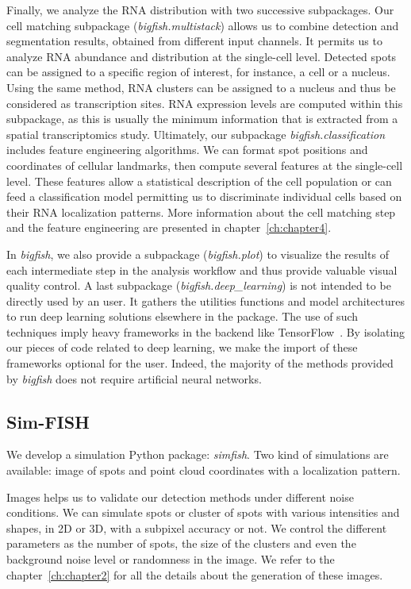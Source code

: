 Finally, we analyze the \ac{RNA} distribution with two successive subpackages.
Our cell matching subpackage (\emph{bigfish.multistack}) allows us to combine detection and segmentation results, obtained from different input channels.
It permits us to analyze \ac{RNA} abundance and distribution at the single-cell level.
Detected spots can be assigned to a specific region of interest, for instance, a cell or a nucleus.
Using the same method, \ac{RNA} clusters can be assigned to a nucleus and thus be considered as transcription sites.
\ac{RNA} expression levels are computed within this subpackage, as this is usually the minimum information that is extracted from a spatial transcriptomics study.
Ultimately, our subpackage \emph{bigfish.classification} includes feature engineering algorithms.
We can format spot positions and coordinates of cellular landmarks, then compute several features at the single-cell level.
These features allow a statistical description of the cell population or can feed a classification model permitting us to discriminate individual cells based on their RNA localization patterns.
More information about the cell matching step and the feature engineering are presented in chapter~\ref{ch:chapter4}.

In \emph{bigfish}, we also provide a subpackage (\emph{bigfish.plot}) to visualize the results of each intermediate step in the analysis workflow and thus provide valuable visual quality control.
A last subpackage (\emph{bigfish.deep\_learning}) is not intended to be directly used by an user.
It gathers the utilities functions and model architectures to run deep learning solutions elsewhere in the package.
The use of such techniques imply heavy frameworks in the backend like TensorFlow~\cite{tensorflow_2015}.
By isolating our pieces of code related to deep learning, we make the import of these frameworks optional for the user.
Indeed, the majority of the methods provided by \emph{bigfish} does not require artificial neural networks.

\subsection{Sim-FISH}
\label{subsec:simfish}

We develop a simulation Python package: \emph{simfish}.
Two kind of simulations are available: image of spots and point cloud coordinates with a localization pattern.

Images helps us to validate our detection methods under different noise conditions.
We can simulate spots or cluster of spots with various intensities and shapes, in 2D or 3D, with a subpixel accuracy or not.
We control the different parameters as the number of spots, the size of the clusters and even the background noise level or randomness in the image.
We refer to the chapter~\ref{ch:chapter2} for all the details about the generation of these images.

